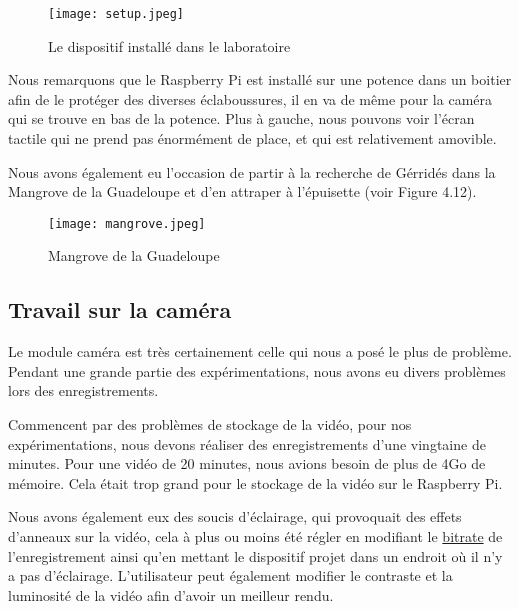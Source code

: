         \begin{figure}[ht]
            \centering
            \texttt{[image: setup.jpeg]} 
            \caption{Le dispositif installé dans le laboratoire}
        \end{figure} 

        Nous remarquons que le Raspberry Pi est installé sur une potence dans un boitier afin de le protéger des diverses éclaboussures, il en va de même pour la caméra qui se trouve en bas de la potence. Plus à gauche, nous pouvons voir l'écran tactile qui ne prend pas énormément de place, et qui est relativement amovible.

        \vspace{0.2cm}

        Nous avons également eu l'occasion de partir à la recherche de Gérridés dans la Mangrove de la Guadeloupe et d'en attraper à l'épuisette (voir Figure 4.12).

        \begin{figure}[ht]
            \centering
            \texttt{[image: mangrove.jpeg]}
            \caption{Mangrove de la Guadeloupe}
        \end{figure}
            
        

        \subsection{Travail sur la caméra}
        Le module caméra est très certainement celle qui nous a posé le plus de problème. Pendant une grande partie des expérimentations, nous avons eu divers problèmes lors des enregistrements.

        \vspace{0.2cm}

        Commencent par des problèmes de stockage de la vidéo, pour nos expérimentations, nous devons réaliser des enregistrements d'une vingtaine de minutes.
        Pour une vidéo de 20 minutes, nous avions besoin de plus de 4Go de mémoire.
        Cela était trop grand pour le stockage de la vidéo sur le Raspberry Pi.

        \vspace{0.2cm}

        Nous avons également eux des soucis d'éclairage, qui provoquait des effets d'anneaux sur la vidéo, cela à plus ou moins été régler en modifiant le \underline{bitrate} de l'enregistrement ainsi qu'en mettant le dispositif projet dans un endroit où il n'y a pas d'éclairage.
        L'utilisateur peut également modifier le contraste et la luminosité de la vidéo afin d'avoir un meilleur rendu.

